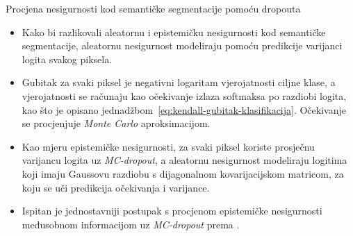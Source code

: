 \documentclass{beamer}
\begin{document}
\begin{frame}[allowframebreaks=0.9]{Procjena nesigurnosti kod semantičke segmentacije pomoću dropouta}
\begin{itemize}
	\item Kako bi razlikovali aleatornu i epistemičku nesigurnosti kod semantičke segmentacije, \citet{Kendall:2017:WUNBDLCV} aleatornu nesigurnost modeliraju pomoću predikcije varijanci logita svakog piksela. 
	\item Gubitak za svaki piksel je negativni logaritam vjerojatnosti ciljne klase, a vjerojatnosti se računaju kao očekivanje izlaza softmaksa po razdiobi logita, kao što je opisano jednadžbom~\eqref{eq:kendall-gubitak-klasifikacija}. Očekivanje se procjenjuje \textit{Monte Carlo} aproksimacijom. 
	\item Kao mjeru epistemičke nesigurnosti, \citet{Kendall:2017:WUNBDLCV} za svaki piksel koriste prosječnu varijancu logita uz \textit{MC-dropout}, a aleatornu nesigurnost modeliraju logitima koji imaju Gaussovu razdiobu s dijagonalnom kovarijacijskom matricom, za koju se uči predikcija očekivanja i varijance. 
	\item Ispitan je jednostavniji postupak s procjenom epistemičke nesigurnosti međusobnom informacijom uz \textit{MC-dropout} prema \citet{Rawat:2017:APEBDL,Smith:2018:UMUAED}. 
	

\end{itemize}
\end{frame}
\end{document}

